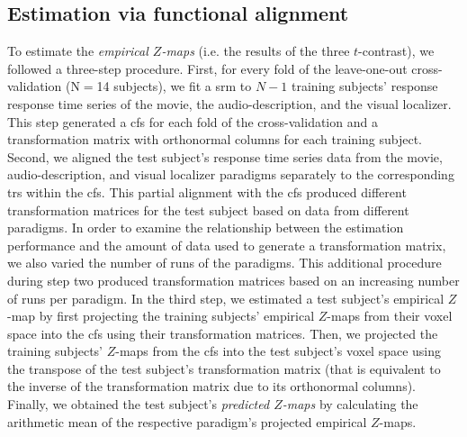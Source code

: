 \subsection{Estimation via functional alignment}
%
To estimate the \textit{empirical $Z$-maps} (i.e. the results of the three
$t$-contrast), we followed a three-step procedure.
First, for every fold of the leave-one-out cross-validation (N$=$14 subjects),
we fit a \ac{srm} to $N-1$ training subjects' response response time series of
the movie, the audio-description, and the visual localizer.
This step generated a \ac{cfs} for each fold of the cross-validation and a
transformation matrix with orthonormal columns for each training subject.
Second, we aligned the test subject's response time series data from the movie,
audio-description, and visual localizer paradigms separately to the
corresponding \acp{tr} within the \ac{cfs}.
%
This partial alignment with the \ac{cfs} produced different transformation
matrices for the test subject based on data from different paradigms.
In order to examine the relationship between the estimation performance and the
amount of data used to generate a transformation matrix, we also varied the
number of runs of the paradigms.
%
This additional procedure during step two produced transformation matrices based
on an increasing number of runs per paradigm.
%
In the third step, we estimated a test subject's empirical $Z$-map by first
projecting the training subjects' empirical $Z$-maps from their voxel space into
the \ac{cfs} using their transformation matrices.
Then, we projected the training subjects' $Z$-maps from the \ac{cfs} into the
test subject's voxel space using the transpose of the test subject's
transformation matrix (that is equivalent to the inverse of the transformation
matrix due to its orthonormal columns).
Finally, we obtained the test subject's \textit{predicted $Z$-maps} by
calculating the arithmetic mean of the respective paradigm's projected empirical
$Z$-maps.



